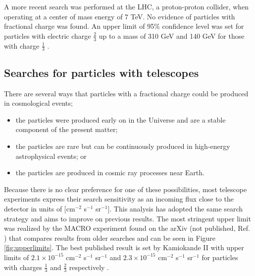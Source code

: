 A more recent search was performed at the LHC, a proton-proton collider, when operating at a center of mass energy of 7 TeV. No evidence of particles with fractional charge was found. An upper limit of 95\% confidence level was set for particles with electric charge $\frac{2}{3}$ up to a mass of 310 GeV and 140 GeV for those with charge $\frac{1}{3}$ \cite{CMS:2012xi}.

\subsection{Searches for particles with telescopes}
There are several ways that particles with a fractional charge could be produced in cosmological events;

\vspace{2mm}
\begin{itemize}
\item the particles were produced early on in the Universe and are a stable component of the present matter;
\item the particles are rare but can be continuously produced in high-energy astrophysical events; or
\item the particles are produced in cosmic ray processes near Earth.
\end{itemize}
\vspace{2mm}

\noindent Because there is no clear preference for one of these possibilities, most telescope experiments express their search sensitivity as an incoming flux close to the detector in units of [cm$^{-2}$ s$^{-1}$ sr$^{-1}$]. This analysis has adopted the same search strategy and aims to improve on previous results. The most stringent upper limit was realized by the MACRO experiment found on the arXiv (not published, Ref. \cite{Ambrosio:2004ub}) that compares results from older searches and can be seen in Figure \ref{fig:upperlimits}. The best published result is set by Kamiokande II with upper limits of $2.1 \times 10^{-15}$ cm$^{-2}$ s$^{-1}$ sr$^{-1}$ and $2.3 \times 10^{-15}$ cm$^{-2}$ s$^{-1}$ sr$^{-1}$ for particles with charges $\frac{1}{3}$ and $\frac{2}{3}$ respectively \cite{Mori:1990kw}.


